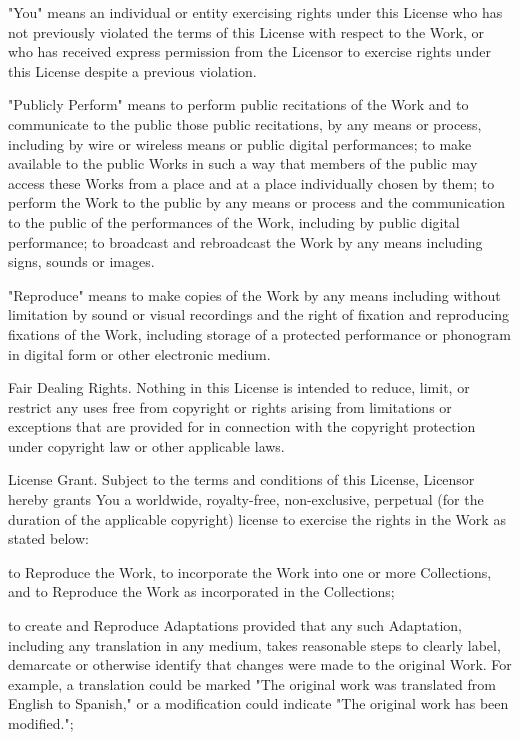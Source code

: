     \item
    "You" means an individual or entity exercising rights under this License who has not previously violated the terms of this License with respect to the Work, or who has received express permission from the Licensor to exercise rights under this License despite a previous violation.

    \item
    "Publicly Perform" means to perform public recitations of the Work and to communicate to the public those public recitations, by any means or process, including by wire or wireless means or public digital performances; to make available to the public Works in such a way that members of the public may access these Works from a place and at a place individually chosen by them; to perform the Work to the public by any means or process and the communication to the public of the performances of the Work, including by public digital performance; to broadcast and rebroadcast the Work by any means including signs, sounds or images.

    \item
    "Reproduce" means to make copies of the Work by any means including without limitation by sound or visual recordings and the right of fixation and reproducing fixations of the Work, including storage of a protected performance or phonogram in digital form or other electronic medium.
    \stopitemize

\item
Fair Dealing Rights. Nothing in this License is intended to reduce, limit, or restrict any uses free from copyright or rights arising from limitations or exceptions that are provided for in connection with the copyright protection under copyright law or other applicable laws.

\item
License Grant. Subject to the terms and conditions of this License, Licensor hereby grants You a worldwide, royalty-free, non-exclusive, perpetual (for the duration of the applicable copyright) license to exercise the rights in the Work as stated below:

    \startitemize[a]
    \item
    to Reproduce the Work, to incorporate the Work into one or more Collections, and to Reproduce the Work as incorporated in the Collections;

    \item
    to create and Reproduce Adaptations provided that any such Adaptation, including any translation in any medium, takes reasonable steps to clearly label, demarcate or otherwise identify that changes were made to the original Work. For example, a translation could be marked "The original work was translated from English to Spanish," or a modification could indicate "The original work has been modified.";

